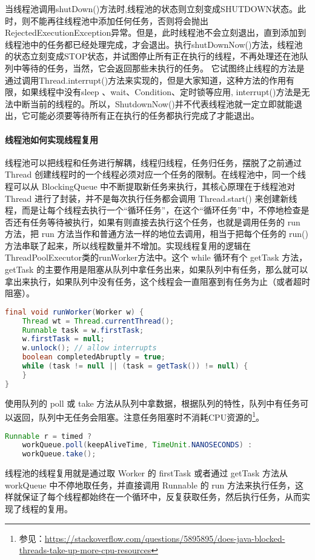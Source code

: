 \documentclass[../../../interview-questions.tex]{subfiles}
\begin{document}
当线程池调用shutDown()方法时,线程池的状态则立刻变成SHUTDOWN状态。此时，则不能再往线程池中添加任何任务，否则将会抛出RejectedExecutionException异常。但是，此时线程池不会立刻退出，直到添加到线程池中的任务都已经处理完成，才会退出。执行shutDownNow()方法，线程池的状态立刻变成STOP状态，并试图停止所有正在执行的线程，不再处理还在池队列中等待的任务，当然，它会返回那些未执行的任务。 
它试图终止线程的方法是通过调用Thread.interrupt()方法来实现的，但是大家知道，这种方法的作用有限，如果线程中没有sleep 、wait、Condition、定时锁等应用, interrupt()方法是无法中断当前的线程的。所以，ShutdownNow()并不代表线程池就一定立即就能退出，它可能必须要等待所有正在执行的任务都执行完成了才能退出。 

\paragraph{线程池如何实现线程复用}

线程池可以把线程和任务进行解耦，线程归线程，任务归任务，摆脱了之前通过 Thread 创建线程时的一个线程必须对应一个任务的限制。在线程池中，同一个线程可以从 BlockingQueue 中不断提取新任务来执行，其核心原理在于线程池对 Thread 进行了封装，并不是每次执行任务都会调用 Thread.start() 来创建新线程，而是让每个线程去执行一个“循环任务”，在这个“循环任务”中，不停地检查是否还有任务等待被执行，如果有则直接去执行这个任务，也就是调用任务的 run 方法，把 run 方法当作和普通方法一样的地位去调用，相当于把每个任务的 run() 方法串联了起来，所以线程数量并不增加。实现线程复用的逻辑在ThreadPoolExecutor类的runWorker方法中。这个 while 循环有个 getTask 方法，getTask 的主要作用是阻塞从队列中拿任务出来，如果队列中有任务，那么就可以拿出来执行，如果队列中没有任务，这个线程会一直阻塞到有任务为止（或者超时阻塞）。

\begin{lstlisting}[language=Java]
final void runWorker(Worker w) {
    Thread wt = Thread.currentThread();
    Runnable task = w.firstTask;
    w.firstTask = null;
    w.unlock(); // allow interrupts
    boolean completedAbruptly = true;
    while (task != null || (task = getTask()) != null) {
    }
}
\end{lstlisting}

使用队列的 poll 或 take 方法从队列中拿数据，根据队列的特性，队列中有任务可以返回，队列中无任务会阻塞。注意任务阻塞时不消耗CPU资源的\footnote{参见：\url{https://stackoverflow.com/questions/5895895/does-java-blocked-threads-take-up-more-cpu-resources}}。

\begin{lstlisting}[language=Java]
Runnable r = timed ?
    workQueue.poll(keepAliveTime, TimeUnit.NANOSECONDS) :
    workQueue.take();
\end{lstlisting}
    

线程池的线程复用就是通过取 Worker 的 firstTask 或者通过 getTask 方法从 workQueue 中不停地取任务，并直接调用 Runnable 的 run 方法来执行任务，这样就保证了每个线程都始终在一个循环中，反复获取任务，然后执行任务，从而实现了线程的复用。
\end{document}
